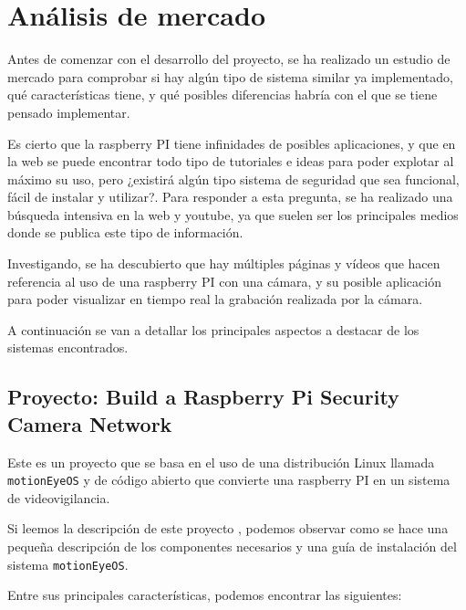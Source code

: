 


\pagestyle{miEstilo3}

\section{Análisis de mercado}

Antes de comenzar con el desarrollo del proyecto, se ha realizado un estudio de mercado para comprobar si hay algún tipo de sistema similar ya implementado, qué características tiene, y qué posibles diferencias habría con el que se tiene pensado implementar.

Es cierto que la raspberry PI tiene infinidades de posibles aplicaciones, y que en la web se puede encontrar todo tipo de tutoriales e ideas para poder explotar al máximo su uso, pero ¿existirá algún tipo sistema de seguridad que sea funcional, fácil de instalar y utilizar?. Para responder a esta pregunta, se ha realizado una búsqueda intensiva en la web y youtube, ya que suelen ser los principales medios donde se publica este tipo de información.

Investigando, se ha descubierto que hay múltiples páginas y vídeos que hacen referencia al uso de una raspberry PI con una cámara, y su posible aplicación para poder visualizar en tiempo real la grabación realizada por la cámara.

A continuación se van a detallar los principales aspectos a destacar de los sistemas encontrados.

\subsection{Proyecto: Build a Raspberry Pi Security Camera Network} \label{sec:pj1}

Este es un proyecto \cite{ref2} que se basa en el uso de una distribución Linux llamada \texttt{motionEyeOS} y de código abierto \cite{ref3} que convierte una raspberry PI en un sistema de videovigilancia.

Si leemos la descripción de este proyecto \cite{ref2}, podemos observar como se hace una pequeña descripción de los componentes necesarios y una guía de instalación del sistema \texttt{motionEyeOS}.

Entre sus principales características, podemos encontrar las siguientes:

